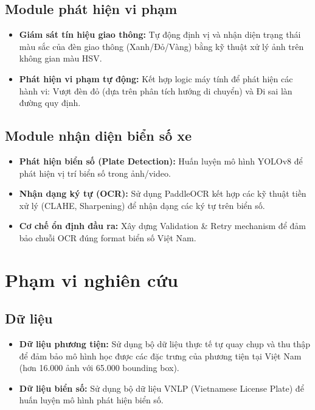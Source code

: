 \subsection{Module phát hiện vi phạm}
\begin{itemize}
    \item \textbf{Giám sát tín hiệu giao thông:} Tự động định vị và nhận diện trạng thái màu sắc của đèn giao thông (Xanh/Đỏ/Vàng) bằng kỹ thuật xử lý ảnh trên không gian màu HSV.
    \item \textbf{Phát hiện vi phạm tự động:} Kết hợp logic máy tính để phát hiện các hành vi: Vượt đèn đỏ (dựa trên phân tích hướng di chuyển) và Đi sai làn đường quy định.
\end{itemize}

\subsection{Module nhận diện biển số xe}
\begin{itemize}
    \item \textbf{Phát hiện biển số (Plate Detection):} Huấn luyện mô hình YOLOv8 để phát hiện vị trí biển số trong ảnh/video.
    \item \textbf{Nhận dạng ký tự (OCR):} Sử dụng PaddleOCR kết hợp các kỹ thuật tiền xử lý (CLAHE, Sharpening) để nhận dạng các ký tự trên biển số.
    \item \textbf{Cơ chế ổn định đầu ra:} Xây dựng Validation \& Retry mechanism để đảm bảo chuỗi OCR đúng format biển số Việt Nam.
\end{itemize}

\section{Phạm vi nghiên cứu}

\subsection{Dữ liệu}
\begin{itemize}
    \item \textbf{Dữ liệu phương tiện:} Sử dụng bộ dữ liệu thực tế tự quay chụp và thu thập để đảm bảo mô hình học được các đặc trưng của phương tiện tại Việt Nam (hơn 16.000 ảnh với 65.000 bounding box).
    \item \textbf{Dữ liệu biển số:} Sử dụng bộ dữ liệu VNLP (Vietnamese License Plate) để huấn luyện mô hình phát hiện biển số.
\end{itemize}

